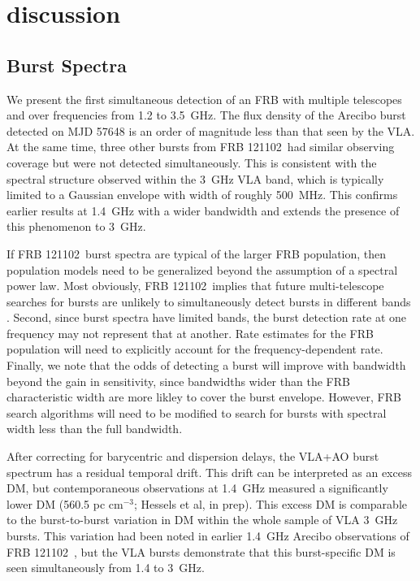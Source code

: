 \documentclass[twocolumn]{aastex61}
\newcommand{\frb}{FRB 121102}
\begin{document}
\section{discussion}
\label{sec:disc}
\subsection{Burst Spectra}

We present the first simultaneous detection of an FRB with multiple telescopes and over frequencies from 1.2 to 3.5~GHz. The flux density of the Arecibo burst detected on MJD 57648 is an order of magnitude less than that seen by the VLA. At the same time, three other bursts from \frb\ had similar observing coverage but were not detected simultaneously. This is consistent with the spectral structure observed within the 3~GHz VLA band, which is typically limited to a Gaussian envelope with width of roughly 500~MHz. This confirms earlier results at 1.4~GHz \citep{2016Natur.531..202S, 2016arXiv160308880S} with a wider bandwidth and extends the presence of this phenomenon to 3~GHz.

If \frb\ burst spectra are typical of the larger FRB population, then population models need to be generalized beyond the assumption of a spectral power law. Most obviously, \frb\ implies that future multi-telescope searches for bursts are unlikely to simultaneously detect bursts in different bands \citep[c.f.][]{1999ApJ...517..460S}. Second, since burst spectra have limited bands, the burst detection rate at one frequency may not represent that at another. Rate estimates for the FRB population will need to explicitly account for the frequency-dependent rate. Finally, we note that the odds of detecting a burst will improve with bandwidth beyond the gain in sensitivity, since bandwidths wider than the FRB characteristic width are more likley to cover the burst envelope. However, FRB search algorithms will need to be modified to search for bursts with spectral width less than the full bandwidth.

After correcting for barycentric and dispersion delays, the VLA+AO burst spectrum has a residual temporal drift. This drift can be interpreted as an excess DM, but contemporaneous observations at 1.4~GHz measured a significantly lower DM (560.5 pc cm$^{-3}$; Hessels et al, in prep). This excess DM is comparable to the burst-to-burst variation in DM within the whole sample of VLA 3~GHz bursts. This variation had been noted in earlier 1.4~GHz Arecibo observations of \frb\ \citep{2016Natur.531..202S,2016arXiv160308880S}, but the VLA bursts demonstrate that this burst-specific DM is seen simultaneously from 1.4 to 3~GHz.
\end{document}
